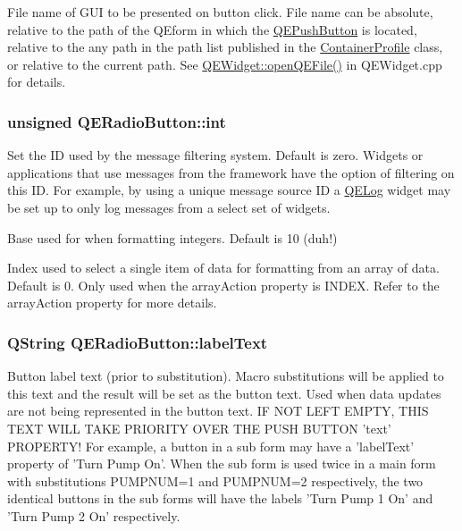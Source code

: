 File name of GUI to be presented on button click. File name can be absolute, relative to the path of the QEform in which the \hyperlink{classQEPushButton}{QEPushButton} is located, relative to the any path in the path list published in the \hyperlink{classContainerProfile}{ContainerProfile} class, or relative to the current path. See \hyperlink{classQEWidget_a1249c1c022d5ec63e0fa82df20356039}{QEWidget::openQEFile()} in QEWidget.cpp for details. \hypertarget{classQERadioButton_a5ce0f55c3e917bff62fab604ed962e29}{
\subsubsection[{int}]{\setlength{\rightskip}{0pt plus 5cm}unsigned QERadioButton::int}}
\label{classQERadioButton_a5ce0f55c3e917bff62fab604ed962e29}
Set the ID used by the message filtering system. Default is zero. Widgets or applications that use messages from the framework have the option of filtering on this ID. For example, by using a unique message source ID a \hyperlink{classQELog}{QELog} widget may be set up to only log messages from a select set of widgets.

Base used for when formatting integers. Default is 10 (duh!)

Index used to select a single item of data for formatting from an array of data. Default is 0. Only used when the arrayAction property is INDEX. Refer to the arrayAction property for more details. \hypertarget{classQERadioButton_a973fe8b514687003017bb7d9ba5ea4ed}{
\subsubsection[{labelText}]{\setlength{\rightskip}{0pt plus 5cm}QString QERadioButton::labelText}}
\label{classQERadioButton_a973fe8b514687003017bb7d9ba5ea4ed}
Button label text (prior to substitution). Macro substitutions will be applied to this text and the result will be set as the button text. Used when data updates are not being represented in the button text. IF NOT LEFT EMPTY, THIS TEXT WILL TAKE PRIORITY OVER THE PUSH BUTTON 'text' PROPERTY! For example, a button in a sub form may have a 'labelText' property of 'Turn Pump  On'. When the sub form is used twice in a main form with substitutions PUMPNUM=1 and PUMPNUM=2 respectively, the two identical buttons in the sub forms will have the labels 'Turn Pump 1 On' and 'Turn Pump 2 On' respectively. 

